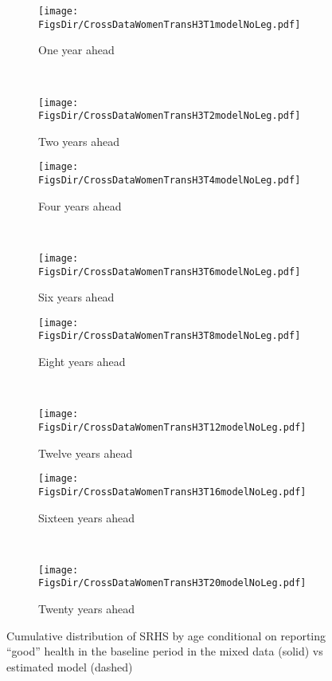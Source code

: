 \documentclass[12pt,pdftex,letterpaper]{article}
\newcommand{\RootDir}{..}
\newcommand{\FigsDir}{\RootDir/Figures}
\begin{document}
\begin{figure}[H]
	\centering
	\begin{subfigure}[b]{0.45\textwidth}
		\texttt{[image: \\FigsDir/CrossDataWomenTransH3T1modelNoLeg.pdf]}
		\caption{One year ahead}
	\end{subfigure}
	~
	\begin{subfigure}[b]{0.45\textwidth}
		\texttt{[image: \\FigsDir/CrossDataWomenTransH3T2modelNoLeg.pdf]}
		\caption{Two years ahead}
	\end{subfigure}
	
	\begin{subfigure}[b]{0.45\textwidth}
		\texttt{[image: \\FigsDir/CrossDataWomenTransH3T4modelNoLeg.pdf]}
		\caption{Four years ahead}
	\end{subfigure}
	~
	\begin{subfigure}[b]{0.45\textwidth}
		\texttt{[image: \\FigsDir/CrossDataWomenTransH3T6modelNoLeg.pdf]}
		\caption{Six years ahead}
	\end{subfigure}

	\begin{subfigure}[b]{0.45\textwidth}
	    \texttt{[image: \\FigsDir/CrossDataWomenTransH3T8modelNoLeg.pdf]}
	    \caption{Eight years ahead}
    \end{subfigure}
    ~
    \begin{subfigure}[b]{0.45\textwidth}
	    \texttt{[image: \\FigsDir/CrossDataWomenTransH3T12modelNoLeg.pdf]}
	    \caption{Twelve years ahead}
    \end{subfigure}

    \begin{subfigure}[b]{0.45\textwidth}
	    \texttt{[image: \\FigsDir/CrossDataWomenTransH3T16modelNoLeg.pdf]}
	    \caption{Sixteen years ahead}
    \end{subfigure}
    ~
    \begin{subfigure}[b]{0.45\textwidth}
	    \texttt{[image: \\FigsDir/CrossDataWomenTransH3T20modelNoLeg.pdf]}
	    \caption{Twenty years ahead}
    \end{subfigure}

	\caption{Cumulative distribution of SRHS by age conditional on reporting ``good'' health in the baseline period in the mixed data (solid) vs estimated model (dashed)}\label{fig:ModelTransMixedGood}
\end{figure}
\thispagestyle{empty}
\end{document}
